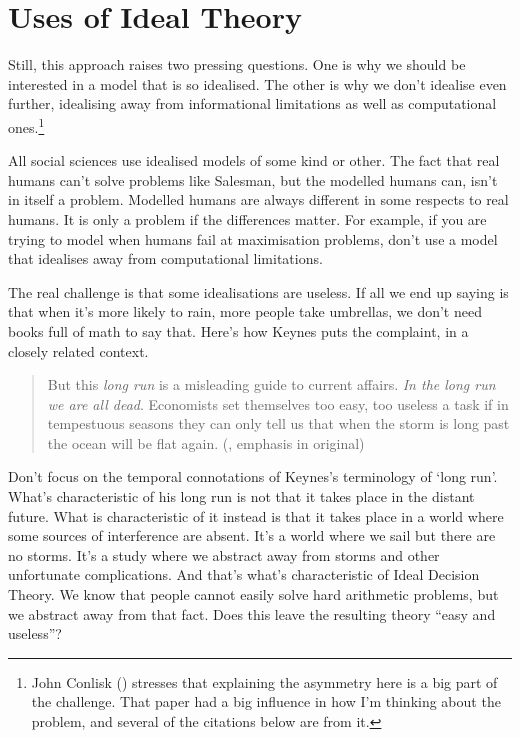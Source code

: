 \documentclass[
  12pt,
  letterpaper,
  DIV=11,
  numbers=noendperiod]{scrreprt}
\begin{document}
\section{Uses of Ideal Theory}\label{sec-uses-ideal}

Still, this approach raises two pressing questions. One is why we should
be interested in a model that is so idealised. The other is why we don't
idealise even further, idealising away from informational limitations as
well as computational ones.\footnote{John Conlisk
  () stresses that explaining the
  asymmetry here is a big part of the challenge. That paper had a big
  influence in how I'm thinking about the problem, and several of the
  citations below are from it.}

All social sciences use idealised models of some kind or other. The fact
that real humans can't solve problems like Salesman, but the modelled
humans can, isn't in itself a problem. Modelled humans are always
different in some respects to real humans. It is only a problem if the
differences matter. For example, if you are trying to model when humans
fail at maximisation problems, don't use a model that idealises away
from computational limitations.

The real challenge is that some idealisations are useless. If all we end
up saying is that when it's more likely to rain, more people take
umbrellas, we don't need books full of math to say that. Here's how
Keynes puts the complaint, in a closely related context.

\begin{quote}
But this \emph{long run} is a misleading guide to current affairs.
\emph{In the long run we are all dead}. Economists set themselves too
easy, too useless a task if in tempestuous seasons they can only tell us
that when the storm is long past the ocean will be flat again.
(, emphasis in original)
\end{quote}

Don't focus on the temporal connotations of Keynes's terminology of
`long run'. What's characteristic of his long run is not that it takes
place in the distant future. What is characteristic of it instead is
that it takes place in a world where some sources of interference are
absent. It's a world where we sail but there are no storms. It's a study
where we abstract away from storms and other unfortunate complications.
And that's what's characteristic of Ideal Decision Theory. We know that
people cannot easily solve hard arithmetic problems, but we abstract
away from that fact. Does this leave the resulting theory ``easy and
useless''?
\end{document}
